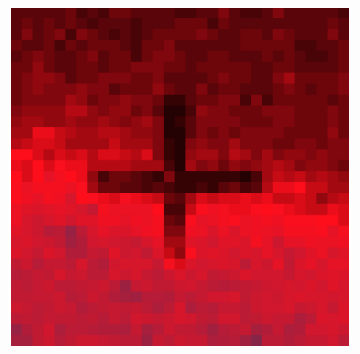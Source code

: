 \documentclass[10pt]{scrartcl}
\begin{document}
\begin{figure}[!ht]
\begin{subfigure}[b]{.3\linewidth}
    \end{subfigure}
    \begin{subfigure}[b]{.3\linewidth}
        \centering
        \includegraphics[width=1.2\linewidth]{../plots_tables_images/1d1dcrop_4_9.eps}
    \end{subfigure}



\end{figure}
\end{document}
